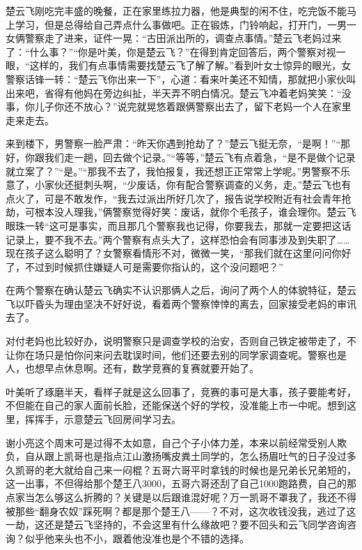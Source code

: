 楚云飞刚吃完丰盛的晚餐，正在家里练拉力器，他是典型的闲不住，吃完饭不能马上学习，但是总得给自己弄点什么事做吧。正在锻炼，门铃响起，打开门，一男一女俩警察走了进来，证件一晃：“古田派出所的，调查点事情。”楚云飞老妈过来了：“什么事？”“你是叶美，你是楚云飞？”在得到肯定回答后，两个警察对视一眼，“这样的，我们有点事情需要找楚云飞了解了解。”看到叶女士惊异的眼光，女警察话锋一转：“楚云飞你出来一下”，心道：看来叶美还不知情，那就把小家伙叫出来吧，省得有他妈在旁边纠扯，半天弄不明白情况。楚云飞冲着老妈笑笑：“没事，你儿子你还不放心？”说完就晃悠着跟俩警察出去了，留下老妈一个人在家里走来走去。

来到楼下，男警察一脸严肃：“昨天你遇到抢劫了？”楚云飞挺无奈，“是啊！”“那好，你跟我们走一趟，回去做个记录。”“等等，”楚云飞有点着急，“是不是做个记录就立案了？”“是。”“那我不去了，我怕报复，我还想正正常常上学呢。”男警察不乐意了，小家伙还挺刺头啊，“少废话，你有配合警察调查的义务，走。”楚云飞也有点火了，可是不敢发作，“我去过派出所好几次了，报告说学校附近有社会青年抢劫，可根本没人理我，”俩警察觉得好笑：废话，就你个毛孩子，谁会理你。楚云飞眼珠一转“这可是事实，而且那几个警察我也记得，你要我去，那就一定要把这话记录上，要不我不去。”两个警察有点头大了，这样恐怕会有同事涉及到失职了……现在孩子这么聪明了？女警察看情形不对，微微一笑，“那我们就在这里问问你好了，不过到时候抓住嫌疑人可是需要你指认的，这个没问题吧？”

在两个警察在确认楚云飞确实不认识那俩人之后，询问了两个人的体貌特征，楚云飞以吓昏头为理由坚决不好好说，看着两个警察悻悻的离去，回家接受老妈的审讯去了。

对付老妈也比较好办，说明警察只是调查学校的治安，否则自己铁定被带走了，不让你在场只是怕你问来问去耽误时间，他们还要去别的同学家调查呢。警察也是人，也想早点休息啊。还有，数学竞赛的复赛就要开始了。

叶美听了琢磨半天，看样子就是这么回事了，竞赛的事可是大事，孩子要能考好，不但能在自己的家人面前长脸，还能保送个好的学校，没准能上市一中呢。想到这里，挥挥手，示意楚云飞回房间学习去。

谢小亮这个周末可是过得不太如意，自己个子小体力差，本来以前经常受别人欺负，自从跟上凯哥也是指点江山激扬嘴皮粪土同学的，怎么扬眉吐气的日子没过多久凯哥的老大就给自己来一闷棍？五哥六哥平时拿钱的时候也是兄弟长兄弟短的，这一出事，不但得给那个楚王八3000，五哥六哥还刮了自己1000跑路费，自己的那点家当怎么够这么折腾的？关键是以后跟谁混好呢？万一凯哥不罩我了，我还不得被那些“翻身农奴”踩死啊？都是那个楚王八——？不对，这次收钱没我，逃过了这一劫，这还是楚云飞坚持的，不会这里有什么缘故吧？要不回头和云飞同学咨询咨询？似乎他来头也不小，跟着他没准也是个不错的选择。

